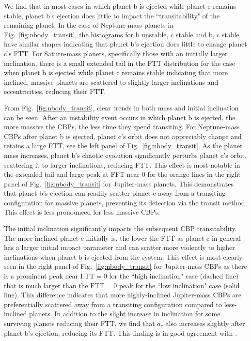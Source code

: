 We find that in most cases in which planet b is ejected while planet c remains stable, planet b's ejection does little to impact the ``transitability" of the remaining planet.  In the case of Neptune-mass planets in Fig.~\ref{fig:nbody_transit}, the histograms for b unstable, c stable and b, c stable have similar shapes indicating that planet b's ejection does little to change planet c's FTT.  For Saturn-mass planets, specifically those with an initially larger inclination, there is a small extended tail in the FTT distribution for the case when planet b is ejected while planet c remains stable indicating that more inclined, massive planets are scattered to slightly larger inclinations and eccentricities, reducing their FTT.  

From Fig.~\ref{fig:nbody_transit}, clear trends in both mass and initial inclination can be seen.  After an instability event occurs in which planet b is ejected, the more massive the CBPs, the less time they spend transiting.  For Neptune-mass CBPs after planet b is ejected, planet c's orbit does not appreciably change and retains a large FTT, see the left panel of Fig.~\ref{fig:nbody_transit}.  As the planet mass increases, planet b's chaotic evolution significantly perturbs planet c's orbit, scattering it to larger inclinations, reducing FTT.  This effect is most notable in the extended tail and large peak at FFT near 0 for the orange lines in the right panel of Fig.~\ref{fig:nbody_transit} for Jupiter-mass planets.  This demonstrates that planet b's ejection can readily scatter planet c away from a transiting configuration for massive planets, preventing its detection via the transit method.  This effect is less pronounced for less massive CBPs.

The initial inclination significantly impacts the subsequent CBP transitability.  The more inclined planet c initially is, the lower the FTT as planet c in general has a larger initial impact parameter and can scatter more violently to higher inclinations when planet b is ejected from the system.  This effect is most clearly seen in the right panel of Fig.~\ref{fig:nbody_transit} for Jupiter-mass CBPs as there is a prominent peak near $\text{FTT}= 0$ for the ``high inclination" case (dashed line) that is much larger than the $\text{FTT}=0$ peak for the ``low inclination" case (solid line).  This difference indicates that more highly-inclined Jupiter-mass CBPs are preferentially scattered away from a transiting configuration compared to less-inclined planets.  In addition to the slight increase in inclination for some surviving planets reducing their FTT, we find that $a_c$ also increases slightly after planet b's ejection, reducing its FTT.  This finding is in good agreement with \citet{Gong2017}.

